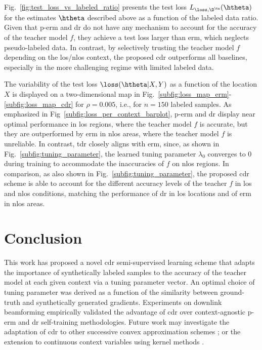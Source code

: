 \documentclass[journal]{IEEEtran}
\begin{document}
Fig.~\ref{fig:test_loss_vs_labeled_ratio} presents the test loss $L_{\loss, \D^\te}(\htheta)$ for the estimates $\htheta$ described above as a function of the labeled data ratio.
Given that \gls{p-erm} and \gls{dr} do not have any mechanism to account for the accuracy of the teacher model $f$, they achieve a test loss larger than \gls{erm}, which neglects pseudo-labeled data.
In contrast, by selectively trusting the teacher model $f$ depending on the \gls{los}/\gls{nlos} context, the proposed \gls{cdr} outperforms all baselines, especially in the more challenging regime with limited labeled data.

The variability of the test loss $\loss(\htheta | X, Y)$ as a function of the location $X$ is displayed on a two-dimensional map in Fig.~\ref{subfig:loss_map_erm}-\ref{subfig:loss_map_cdr} for $\rho = 0.005$, i.e., for $n=150$ labeled samples.
As emphasized in Fig~\ref{subfig:loss_per_context_barplot}, \gls{p-erm} and \gls{dr} display near optimal performance in \gls{los} regions, where the teacher model $f$ is accurate, but they are outperformed by \gls{erm} in \gls{nlos} areas, where the teacher model $f$ is unreliable.
In contrast, \gls{tdr} closely aligns with \gls{erm}, since, as shown in Fig.~\ref{subfig:tuning_parameter}, the learned tuning parameter $\lambda_0$ converges to $0$ during training to accommodate the inaccuracies of $f$ on \gls{nlos} regions.
In comparison, as also shown in Fig.~\ref{subfig:tuning_parameter}, the proposed \gls{cdr} scheme is able to account for the different accuracy levels of the teacher $f$ in \gls{los} and \gls{nlos} conditions, matching the performance of \gls{dr} in \gls{los} locations and of \gls{erm} in \gls{nlos} areas.


\section{Conclusion}

This work has proposed a novel \gls{cdr} semi-supervised learning scheme that adapts the importance of synthetically labeled samples to the accuracy of the teacher model at each given context via a tuning parameter vector.
An optimal choice of tuning parameter was derived as a function of the similarity between ground-truth and synthetically generated gradients.
Experiments on downlink beamforming empirically validated the advantage of \gls{cdr} over context-agnostic \gls{p-erm} and \gls{dr} self-training methodologies.
Future work may investigate the adaptation of \gls{cdr} to other successive convex approximation schemes \cite{marks1978general, razaviyayn2014parallel, liu2019stochastic}; or the extension to continuous context variables using kernel methods \cite{hofmann2008kernel}.
\end{document}
